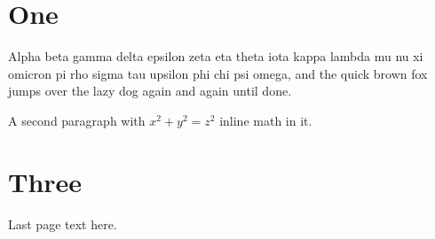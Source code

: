 \documentclass{article}
\begin{document}
\section{One}
Alpha beta gamma delta epsilon zeta eta theta iota kappa lambda mu
nu xi omicron pi rho sigma tau upsilon phi chi psi omega, and the
quick brown fox jumps over the lazy dog again and again until done.

A second paragraph with $x^2 + y^2 = z^2$ inline math in it.

\newpage
\section{Three}
Last page text here.
\end{document}
